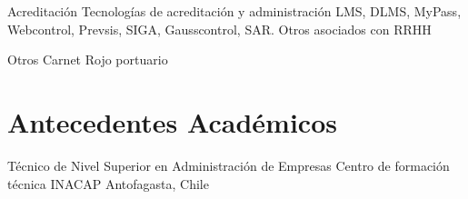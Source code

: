 \documentclass[draft,color,12pt,letterpaper,sans]{moderncv}
\begin{document}
\cventry {}
{Acreditación}
{Tecnologías de acreditación y administración}
{}
{\newline LMS, DLMS, MyPass, Webcontrol, Prevsis, SIGA, Gausscontrol, SAR. \newline Otros asociados con RRHH}
{}

\cventry {}
{Otros}
{}
{}
{\newline Carnet Rojo portuario}
{}

\section{Antecedentes Académicos}
{Técnico de Nivel Superior en Administración de Empresas}
{Centro de formación técnica INACAP}
{Antofagasta, Chile}
{}
{}
\end{document}
